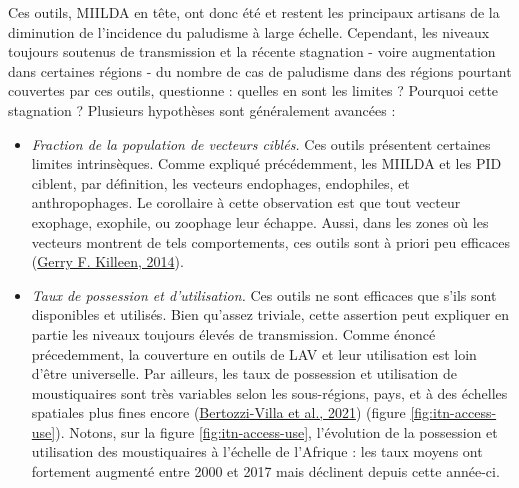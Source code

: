 \documentclass[12pt,twoside]{reedthesis}
\begin{document}
Ces outils, MIILDA en tête, ont donc été et restent les principaux artisans de la diminution de l'incidence du paludisme à large échelle. Cependant, les niveaux toujours soutenus de transmission et la récente stagnation - voire augmentation dans certaines régions - du nombre de cas de paludisme dans des régions pourtant couvertes par ces outils, questionne : quelles en sont les limites ? Pourquoi cette stagnation ? Plusieurs hypothèses sont généralement avancées :
\begin{itemize}
\item
  \emph{Fraction de la population de vecteurs ciblés.} Ces outils présentent certaines limites intrinsèques. Comme expliqué précédemment, les MIILDA et les PID ciblent, par définition, les vecteurs endophages, endophiles, et anthropophages. Le corollaire à cette observation est que tout vecteur exophage, exophile, ou zoophage leur échappe. Aussi, dans les zones où les vecteurs montrent de tels comportements, ces outils sont à priori peu efficaces (\protect\hyperlink{ref-killeen_characterizing_2014}{Gerry F. Killeen, 2014}).
\item
  \emph{Taux de possession et d'utilisation.} Ces outils ne sont efficaces que s'ils sont disponibles et utilisés. Bien qu'assez triviale, cette assertion peut expliquer en partie les niveaux toujours élevés de transmission. Comme énoncé précedemment, la couverture en outils de LAV et leur utilisation est loin d'être universelle. Par ailleurs, les taux de possession et utilisation de moustiquaires sont très variables selon les sous-régions, pays, et à des échelles spatiales plus fines encore (\protect\hyperlink{ref-bertozzi-villa_maps_2021}{Bertozzi-Villa et al., 2021}) (figure \ref{fig:itn-access-use}). Notons, sur la figure \ref{fig:itn-access-use}, l'évolution de la possession et utilisation des moustiquaires à l'échelle de l'Afrique : les taux moyens ont fortement augmenté entre 2000 et 2017 mais déclinent depuis cette année-ci.
\end{itemize}
\end{document}
